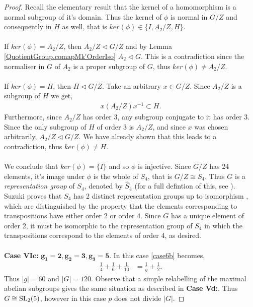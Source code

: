 \begin{proof}
Recall the elementary result that the kernel of a homomorphism is a normal subgroup of it's domain. Thus the kernel of $\phi$ is normal in $G / Z$ and consequently in $H$ as well, that is $ker(\phi) \in\{ I , A_2 / Z, H \}$. \\
\\
If $ker(\phi) = A_2 / Z$, then $A_2 / Z \vartriangleleft G / Z$ and by Lemma \ref{QuotientGroup.comapMk'OrderIso} $A_2 \vartriangleleft G$. This is a contradiction since the normaliser in $G$ of $A_2$ is a proper subgroup of $G$, thus $ker(\phi) \neq A_2 / Z$. \\
\\
If $ker(\phi) = H$, then $H \vartriangleleft G / Z$. Take an arbitrary $x \in G / Z$. Since $A_2 / Z$ is a subgroup of $H$ we get,
\begin{align*} x (A_2 / Z) x^{-1} \subset H.
\end{align*}
Furthermore, since $A_2 / Z$ has order 3, any subgroup conjugate to it has order 3. Since the only subgroup of $H$ of order 3 is $A_2 / Z$, and since $x$ was chosen arbitrarily, $A_2 / Z \vartriangleleft G / Z$. We have already shown that this leads to a contradiction, thus $ker(\phi) \neq H$. \\
\\
We conclude that $ker(\phi) = \{ I \}$ and so $\phi$ is injective. Since $G / Z$ has 24 elements, it's image under $\phi$ is the whole of $S_4$, that is $G / Z \cong S_4$. Thus $G$ is a \textit{representation group} of $S_4$, denoted by $\widehat{S}_4$ (for a full defintion of this, see \cite{suzuki}). Suzuki proves that $S_4$ has 2 distinct representation groups up to isomorphism \cite[p.301]{suzuki}, which are distinguished by the property that the elements corresponding to transpositions have either order 2 or order 4. Since $G$ has a unique element of order 2, it must be isomorphic to the representation group of $S_4$ in which the transpositions correspond to the elements of order 4, as desired.\\
\\
 \space \textbf{Case VIc:} $\pmb{g_1 = 2, g_2 = 3, g_3 = 5}$.  In this case \eqref{case6b} becomes,
\begin{align*} \frac{1}{4} + \frac{1}{6} + \frac{1}{10} &= \frac{1}{g} + \frac{1}{2}.
\end{align*}
Thus $|g| = 60$ and $|G| = 120$. Observe that a simple relabelling of the maximal abelian subgroups gives the same situation as described in \textbf{Case Vd:}. Thus $G \cong \operatorname{SL}_2(5)$, however in this case $p$ does not divide $|G|$.

\end{proof}


